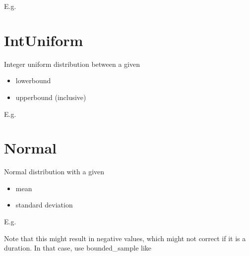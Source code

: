 \documentclass[letterpaper,10pt,english]{sphinxmanual}
\begin{document}
E.g.

\begin{sphinxVerbatim}[commandchars=\\\{\}]
    
\end{sphinxVerbatim}


\section{IntUniform}
\label{\detokenize{Distributions:intuniform}}
Integer uniform distribution between a given
\begin{itemize}
\item {} 
lowerbound

\item {} 
upperbound (inclusive)

\end{itemize}

E.g.

\begin{sphinxVerbatim}[commandchars=\\\{\}]
   
\end{sphinxVerbatim}


\section{Normal}
\label{\detokenize{Distributions:normal}}
Normal distribution with a given
\begin{itemize}
\item {} 
mean

\item {} 
standard deviation

\end{itemize}

E.g.

\begin{sphinxVerbatim}[commandchars=\\\{\}]
     
\end{sphinxVerbatim}

Note that this might result in negative values, which might not correct if it is a duration. In that case,
use bounded\_sample like
\end{document}
